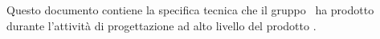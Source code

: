 Questo documento contiene la specifica tecnica che il gruppo \gruppo\ ha prodotto durante l'attività di progettazione ad alto livello del prodotto \progetto.
